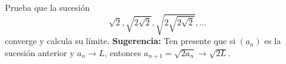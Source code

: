 \documentclass[12pt,a4paper]{article}
\begin{document}
    \begin{mdframed}[style=mdbluebox,frametitle={Ejercicio 8}]
        Prueba que la sucesión
        \begin{equation*}
            \sqrt{2},\sqrt{2\sqrt{2}},\sqrt{2\sqrt{2\sqrt{2}}},\dots
        \end{equation*}
        converge y calcula su límite. \textbf{Sugerencia:} Ten presente que si
        $(a_{n})$ es la sucesión anterior y $a_{n}\to L$, entonces $a_{n+1}=\sqrt{2a_{n}}\to\sqrt{2L}$.
    \end{mdframed}
\end{document}
